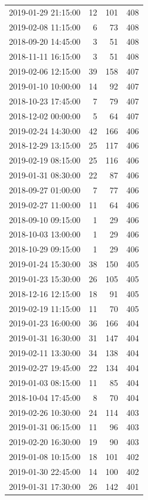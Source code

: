 \begin{tabular}{lrrr}
2019-01-29 21:15:00 & 12 & 101 & 408 \\
2019-02-08 11:15:00 & 6 & 73 & 408 \\
2018-09-20 14:45:00 & 3 & 51 & 408 \\
2018-11-11 16:15:00 & 3 & 51 & 408 \\
2019-02-06 12:15:00 & 39 & 158 & 407 \\
2019-01-10 10:00:00 & 14 & 92 & 407 \\
2018-10-23 17:45:00 & 7 & 79 & 407 \\
2018-12-02 00:00:00 & 5 & 64 & 407 \\
2019-02-24 14:30:00 & 42 & 166 & 406 \\
2018-12-29 13:15:00 & 25 & 117 & 406 \\
2019-02-19 08:15:00 & 25 & 116 & 406 \\
2019-01-31 08:30:00 & 22 & 87 & 406 \\
2018-09-27 01:00:00 & 7 & 77 & 406 \\
2019-02-27 11:00:00 & 11 & 64 & 406 \\
2018-09-10 09:15:00 & 1 & 29 & 406 \\
2018-10-03 13:00:00 & 1 & 29 & 406 \\
2018-10-29 09:15:00 & 1 & 29 & 406 \\
2019-01-24 15:30:00 & 38 & 150 & 405 \\
2019-01-23 15:30:00 & 26 & 105 & 405 \\
2018-12-16 12:15:00 & 18 & 91 & 405 \\
2019-02-19 11:15:00 & 11 & 70 & 405 \\
2019-01-23 16:00:00 & 36 & 166 & 404 \\
2019-01-31 16:30:00 & 31 & 147 & 404 \\
2019-02-11 13:30:00 & 34 & 138 & 404 \\
2019-02-27 19:45:00 & 22 & 134 & 404 \\
2019-01-03 08:15:00 & 11 & 85 & 404 \\
2018-10-04 17:45:00 & 8 & 70 & 404 \\
2019-02-26 10:30:00 & 24 & 114 & 403 \\
2019-01-31 06:15:00 & 11 & 96 & 403 \\
2019-02-20 16:30:00 & 19 & 90 & 403 \\
2019-01-08 10:15:00 & 18 & 101 & 402 \\
2019-01-30 22:45:00 & 14 & 100 & 402 \\
2019-01-31 17:30:00 & 26 & 142 & 401 \\

\end{tabular}
